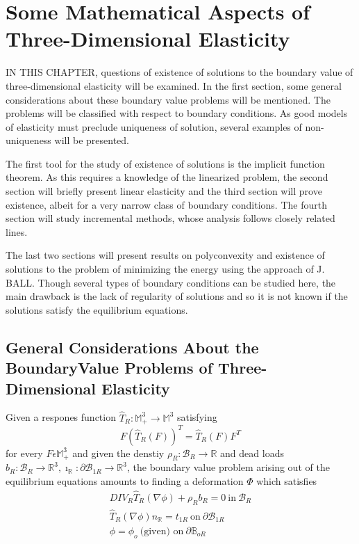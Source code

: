 \chapter[Some Mathematical Aspects of Three-Dimensional.....]{Some Mathematical Aspects of Three-Dimensional
  Elasticity}\label{chap2}\pageoriginale 

IN THIS CHAPTER, questions of existence of solutions to the boundary
value of three-dimensional elasticity will be examined. In the first
section, some general considerations about these boundary value
problems will be mentioned. The problems will be classified with
respect to boundary conditions. As good models of elasticity must
preclude uniqueness of solution, several examples of non-uniqueness
will be presented.  

The first tool for the study of existence of solutions is the implicit
function theorem. As this requires a knowledge of the linearized
problem, the second section will briefly present linear elasticity and
the third section will prove existence, albeit for a very narrow class
of boundary conditions. The fourth section will study incremental
methods, whose analysis follows closely related lines.  

The last two sections will present results on polyconvexity and
existence of solutions to the problem of minimizing the energy using
the approach of J. BALL. Though several types of boundary conditions
can be studied here, the main drawback is the lack of regularity of
solutions and so it is not known if the solutions satisfy the
equilibrium equations.
  
\section[General Considerations\ldots]{General Considerations About
  the Boundary\break Value Problems of 
  Three-Dimensional Elasti\-city}\label{chap2-sec2.1}\pageoriginale 


Given a respones function $\hat{T}_R : \mathbb{M}^3_+ \to
\mathbb{M}^3$ satisfying 
\begin{equation*}
  F (\hat{T}_R (F))^T = \hat{T}_R (F)F^T \tag{2.1-1}\label{eq2.1-1}
\end{equation*}
for every $F \epsilon \mathbb{M}^3_+$ and given the denstiy $\rho_R
: \mathcal{B}_R \to \mathbb{R}$ and dead loads $b_R : \mathcal{B}_R
\to \mathbb{R}^3, \imath_{\mathbb{R}} :\partial \mathcal{B}_{1R} \to
\mathbb{R}^3$, the boundary value problem arising out of the
equilibrium equations amounts to finding a deformation $\Phi$ which
satisfies 
\begin{gather*}
  DIV_R \hat{T}_R (\nabla \phi) + \rho_R b_R = 0 ~
  \text{in}~\mathcal{B}_R \tag{2.1-2}\label{eq2.1-2} \\
 \hat{T}_R (\nabla \phi)n_{\mathbb{R}} = t_{1R} ~\text{on}~
 \partial \mathcal{B}_{1R} \tag{2.1-3}\label{eq2.1-3} \\
\phi = \phi_o ~\text{(given) on}~ \partial \mathbb{B}_{oR}
\tag{2.1-4}\label{eq2.1-4}
\end{gather*}


